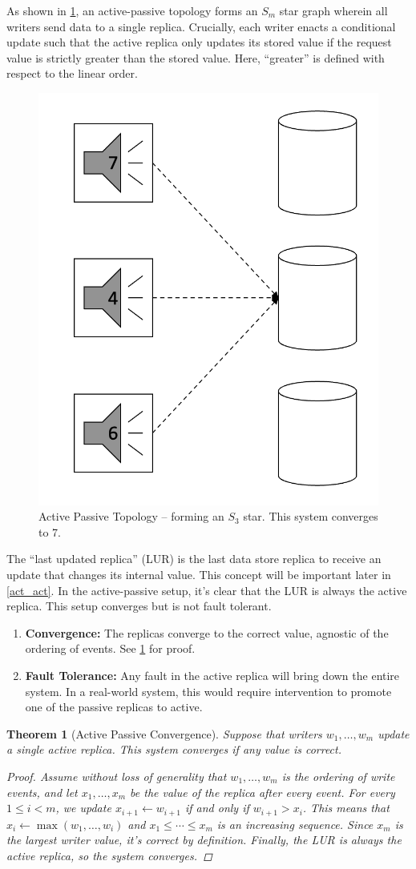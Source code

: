 \documentclass[12pt]{article}
\newtheorem{theorem}{Theorem}%
\begin{document}
As shown in \cref{act_pass_img}, an active-passive topology forms an \(S_m\) star graph wherein all writers send data to a single replica. Crucially, each writer enacts a conditional update such that the active replica only updates its stored value if the request value is strictly greater than the stored value. Here, ``greater'' is defined with respect to the linear order.

\begin{figure}[htbp]
	\centering
	\includegraphics[width=.45\textwidth]{act_pass.png}
	\caption{Active Passive Topology -- forming an \(S_3\) star. This system converges to 7.}
	\label{act_pass_img}
\end{figure}

The ``last updated replica'' (LUR) is the last data store replica to receive an update that changes its internal value. This concept will be important later in \cref{act_act}. In the active-passive setup, it's clear that the LUR is always the active replica. This setup converges but is not fault tolerant.
\begin{enumerate}
	\item \textbf{Convergence:} The replicas converge to the correct value, agnostic of the ordering of events. See \cref{act_pass_converge} for proof.
	
	\item \textbf{Fault Tolerance:} Any fault in the active replica will bring down the entire system. In a real-world system, this would require intervention to promote one of the passive replicas to active.
\end{enumerate}

\begin{theorem}[Active Passive Convergence] \label{act_pass_converge}
	Suppose that writers \(w_1, \dotsc, w_m\) update a single active replica. This system converges if any value is correct.
	\begin{proof}
		Assume without loss of generality that \(w_1, \dotsc, w_m\) is the ordering of write events, and let \(x_1, \dotsc, x_m\) be the value of the replica after every event. For every \(1 \leq i < m\), we update \(x_{i + 1} \gets w_{i + 1}\) if and only if \(w_{i + 1} > x_i\). This means that \(x_i \gets \max(w_1, \dotsc, w_i)\) and \(x_1 \leq \dotsm \leq x_m\) is an increasing sequence. Since \(x_m\) is the largest writer value, it's correct by definition. Finally, the LUR is always the active replica, so the system converges.
	\end{proof}
\end{theorem}
\end{document}
